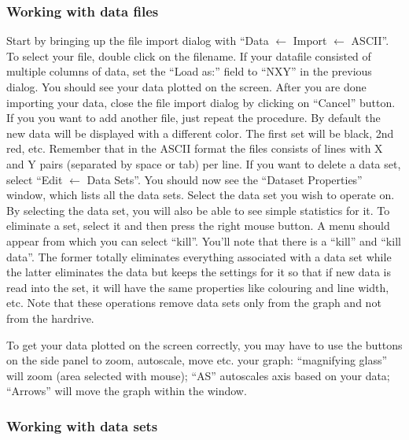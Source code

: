 \documentclass[byrevtex,amssymb,aps,pra,floatfix,letterpaper]{revtex4}
\begin{document}
\subsubsection{Working with data files}

Start by bringing up the file import dialog with ``Data $\leftarrow$ Import $\leftarrow$ ASCII''. To select your file, double click on the filename. If your datafile consisted of multiple columns of data, set the ``Load as:'' field to ``NXY'' in the previous dialog.
You should see your data plotted on the screen. After you are done importing your data, close the file import dialog by clicking on ``Cancel'' button. If you you want to add another file, just repeat the procedure. By default the new data will be displayed with a different color. The first set will be black, 2nd red, etc. Remember that in the ASCII format the files consists of lines with X and Y pairs (separated by space or tab) per line. If you want to delete a data set, select ``Edit $\leftarrow$ Data Sets''. You should now see the ``Dataset Properties'' window, which lists all the data sets. Select the data set you wish to operate on. By selecting the data set, you will also be able to see simple statistics for it. To eliminate a set, select it and then press the right mouse button. A menu should appear from which you can select ``kill''. You'll note that there is a ``kill'' and ``kill data''. The former totally eliminates everything associated with a data set while the latter eliminates the data but keeps the settings for it so that if new data is read into the set, it will have the same properties like colouring and line width, etc. Note that these operations remove data sets only from the graph and not from the hardrive. 

To get your data plotted on the screen correctly, you may have to use the buttons on the side panel to zoom, autoscale, move etc. your graph: ``magnifying glass'' will zoom (area selected with mouse); ``AS'' autoscales axis based on your data; ``Arrows'' will move the graph within the window.

\subsubsection{Working with data sets}
\end{document}
